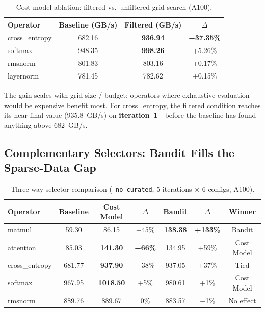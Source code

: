 \documentclass[11pt]{article}
\begin{document}
\begin{table}[t]
\centering
\caption{Cost model ablation: filtered vs.\ unfiltered grid search (A100).}
\label{tab:cost-model}
\small
\begin{tabular}{@{}lccc@{}}
\toprule
Operator & Baseline (GB/s) & Filtered (GB/s) & $\Delta$ \\
\midrule
cross\_entropy & 682.16 & \textbf{936.94} & \textbf{+37.35\%} \\
softmax & 948.35 & \textbf{998.26} & +5.26\% \\
rmsnorm & 801.83 & 803.16 & +0.17\% \\
layernorm & 781.45 & 782.62 & +0.15\% \\
\bottomrule
\end{tabular}
\end{table}

The gain scales with grid size / budget: operators where exhaustive evaluation
would be expensive benefit most. For cross\_entropy, the filtered condition
reaches its near-final value (935.8~GB/s) on \textbf{iteration~1}---before the
baseline has found anything above 682~GB/s.


\subsection{Complementary Selectors: Bandit Fills the Sparse-Data Gap}
\label{sec:selectors}

\begin{table}[t]
\centering
\caption{Three-way selector comparison (\texttt{--no-curated}, 5 iterations $\times$ 6 configs, A100).}
\label{tab:selectors}
\small
\begin{tabular}{@{}lcccccc@{}}
\toprule
Operator & Baseline & Cost Model & $\Delta$ & Bandit & $\Delta$ & Winner \\
\midrule
matmul & 59.30 & 86.15 & +45\% & \textbf{138.38} & \textbf{+133\%} & Bandit \\
attention & 85.03 & \textbf{141.30} & \textbf{+66\%} & 134.95 & +59\% & Cost Model \\
cross\_entropy & 681.77 & \textbf{937.90} & +38\% & 937.05 & +37\% & Tied \\
softmax & 967.95 & \textbf{1018.50} & +5\% & 980.61 & +1\% & Cost Model \\
rmsnorm & 889.76 & 889.67 & 0\% & 883.57 & $-$1\% & No effect \\
\bottomrule
\end{tabular}
\end{table}
\end{document}
